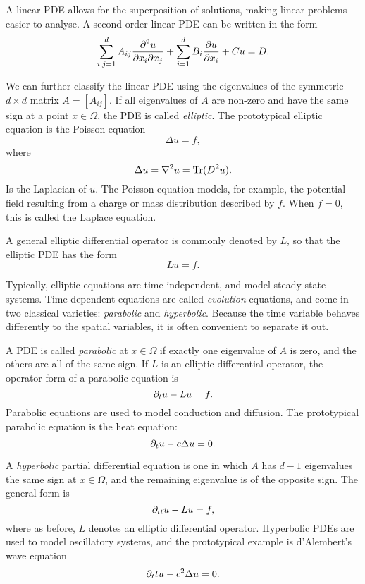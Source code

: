 A linear PDE allows for the superposition of solutions, making linear problems easier to analyse. A second order linear PDE can be written in the form
\begin{equation}
\sum_{i,j=1}^d A_{ij} \frac{{\partial}^2 u}{{\partial} x_i {\partial} x_j} + \sum_{i=1}^d B_i \frac{{\partial} u}{{\partial} x_i} + Cu = D.
\label{eq:lin2pde}
\end{equation}

We can further classify the linear PDE using the eigenvalues of the symmetric $d \times d$  matrix $A=[A_{ij}]$. If all eigenvalues of $A$ are non-zero and have the same sign at a point $x\in\Omega$, the PDE is called \textit{elliptic}. The prototypical elliptic equation is the Poisson equation
\begin{equation}
\Delta u = f,
\label{eq:Poisson}
\end{equation}
where 
\begin{equation}
\Delta u = \nabla^2 u = \operatorname{Tr}(D^2 u).
\end{equation}
Is the Laplacian of $u$. The Poisson equation models, for example, the potential field resulting from a charge or mass distribution described by $f$. When $f=0$, this is called the Laplace equation. 

A general elliptic differential operator is commonly denoted by $L$, so that the elliptic PDE has the form
\[ Lu=f. \] 

Typically, elliptic equations are time-independent, and model steady state systems. Time-dependent equations are called \textit{evolution} equations, and come in two classical varieties: \textit{parabolic} and \textit{hyperbolic}. Because the time variable behaves differently to the spatial variables, it is often convenient to separate it out. 

A PDE is called \textit{parabolic} at $x\in\Omega$ if exactly one eigenvalue of $A$ is zero, and the others are all of the same sign.  If $L$ is an elliptic differential operator, the operator form of a parabolic equation is 
\begin{equation}
{\partial}_t u- Lu = f.
\label{eq:parabolic}
\end{equation}
Parabolic equations are used to model conduction and diffusion. The prototypical parabolic equation is the heat equation:
\begin{equation}
\label{eq:heat}
{\partial}_t u - c \Delta u =0.
\end{equation}

A \textit{hyperbolic} partial differential equation is one in which $A$ has $d-1$  eigenvalues the same sign at $x\in\Omega$, and the remaining eigenvalue is of the opposite sign. The general form is 
\begin{equation}
{\partial}_{tt} u -Lu=f,
\label{eq:hyperbolic}
\end{equation}
where as before, $L$ denotes an elliptic differential operator. Hyperbolic PDEs are used to model oscillatory systems, and the prototypical example is d'Alembert's wave equation
\begin{equation}
{\partial}_tt u - c^2 \Delta u=0.
\label{eq:dalembert}
\end{equation}


